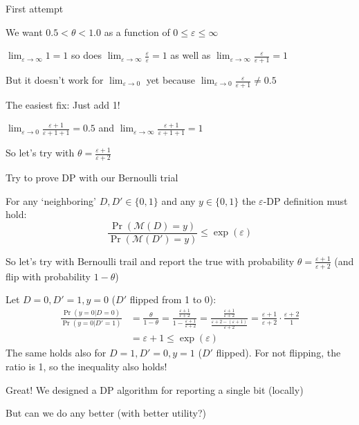 \documentclass[12pt,aspectratio=169,handout]{beamer}
\begin{document}
\begin{frame}{First attempt}

We want $0.5 < \theta < 1.0$ as a function of $0 \leq \varepsilon \leq \infty$

$\lim_{\varepsilon \to \infty} 1 = 1$
so does
$\lim_{\varepsilon \to \infty} \frac{\varepsilon}{\varepsilon} = 1$
as well as
$\lim_{\varepsilon \to \infty} \frac{\varepsilon}{\varepsilon + 1} = 1$

But it doesn't work for $\lim_{\varepsilon \to 0}$ yet because $\lim_{\varepsilon \to 0} \frac{\varepsilon}{\varepsilon + 1} \neq 0.5$

The easiest fix: Just add 1!

$\lim_{\varepsilon \to 0} \frac{\varepsilon + 1}{\varepsilon + 1 + 1} = 0.5$ and $\lim_{\varepsilon \to \infty} \frac{\varepsilon + 1}{\varepsilon + 1 + 1} = 1$

So let's try with $\theta = \frac{\varepsilon + 1}{\varepsilon + 2}$


\end{frame}



\begin{frame}{Try to prove DP with our Bernoulli trial}

For any `neighboring' $D, D' \in \{0, 1\}$ and any $y \in \{0, 1\}$ the $\varepsilon$-DP definition must hold:
$$
\frac{
	\Pr(\mathcal{M}(D) = y)
}{
	\Pr(\mathcal{M}(D') = y)
} \leq \exp(\varepsilon)
$$


So let's try with Bernoulli trail and report the true with probability $\theta = \frac{\varepsilon + 1}{\varepsilon + 2}$ (and flip with probability  $1 - \theta$)

\end{frame}





\begin{frame}

Let $D = 0, D' = 1, y = 0$ ($D'$ flipped from 1 to 0):
$$
\begin{aligned}
\frac{\Pr(y = 0 | D = 0)}{\Pr(y = 0 | D' = 1)} &=
\frac{\theta}{1 - \theta}
=
\frac{
\frac{\varepsilon + 1}{\varepsilon + 2}
}{
	1 - \frac{\varepsilon + 1}{\varepsilon + 2}
}
=
\frac{
\frac{\varepsilon + 1}{\varepsilon + 2}
}{
\frac{\varepsilon + 2 - (\varepsilon + 1)}{\varepsilon + 2}
}
=
\frac{\varepsilon + 1}{\varepsilon + 2}
\cdot
\frac{\varepsilon + 2}{1}
\\
&=
\varepsilon + 1
\leq \exp(\varepsilon)
\end{aligned}
$$
The same holds also for $D = 1, D' = 0, y = 1$ ($D'$ flipped). For not flipping, the ratio is 1, so the inequality also holds!

Great! We designed a DP algorithm for reporting a single bit (locally)

But can we do any better (with better utility?)

\end{frame}
\end{document}
